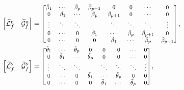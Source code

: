 {\begingroup\allowdisplaybreaks
\begin{align*}
    \begin{bmatrix}
        \widetilde{\mathcal{L}}^\mathrm{u}_f & \widetilde{\mathcal{G}}^\mathrm{u}_f 
    \end{bmatrix}&= {\scriptsize
    {\begingroup\renewcommand*{\arraystretch}{1.0}
    \begin{bmatrix}
        \tilde{\beta}_1     & \cdots      & \tilde{\beta}_{p}   & \tilde{\beta}_{p+1} & 0           & 0           & \cdots      & 0          \\
        0           & \tilde{\beta}_1     & \cdots      & \tilde{\beta}_{p}   & \tilde{\beta}_{p+1} & 0           & \cdots      & 0          \\
        \vdots      & \ddots      & \ddots      &             & \ddots      & \ddots      & \ddots      & \vdots     \\
        0           & \cdots      & 0           & \tilde{\beta}_1     & \cdots      & \tilde{\beta}_{p}   & \tilde{\beta}_{p+1} & 0          \\
        0           & \cdots      & 0           & 0           & \tilde{\beta}_1     & \cdots      & \tilde{\beta}_{p}   & \tilde{\beta}_{p+1}\\
    \end{bmatrix}
    \endgroup}
    },\\
    \begin{bmatrix}
        \widetilde{\mathcal{L}}^\mathrm{y}_f & \widetilde{\mathcal{G}}^\mathrm{y}_f 
    \end{bmatrix}&= {\scriptsize
    \begin{bmatrix}
        \tilde{\theta}_1    & \cdots      & \tilde{\theta}_{p}  & 0            & 0            & 0           & \cdots       & 0          \\
        0           & \tilde{\theta}_1    & \cdots      & \tilde{\theta}_{p}   & 0            & 0           & \cdots       & 0          \\
        \vdots      & \ddots      & \ddots      &              & \ddots       & \ddots      & \ddots       & \vdots     \\
        0           & \cdots      & 0           & \tilde{\theta}_1     & \cdots       & \tilde{\theta}_{p}  & 0            & 0          \\
        0           & \cdots      & 0           & 0            & \tilde{\theta}_1     & \cdots      & \tilde{\theta}_{p}   & 0          \\
    \end{bmatrix}},
\end{align*} \endgroup}
